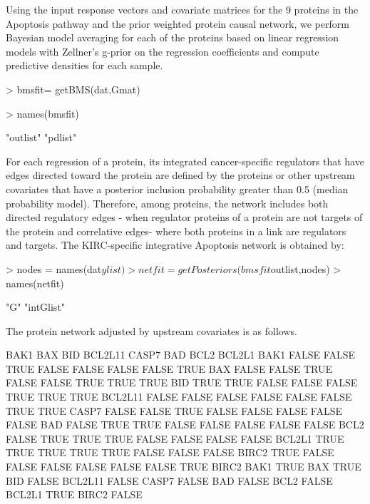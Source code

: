 \documentclass{article}
\begin{document}
Using the input response vectors and covariate matrices for the 9 proteins in the Apoptosis pathway and the prior weighted protein causal network, we perform Bayesian model averaging for each of the proteins based on linear regression models with Zellner's g-prior on the regression coefficients and compute predictive densities for each sample.
\begin{Schunk}
\begin{Sinput}
> bmsfit= getBMS(dat,Gmat)
\end{Sinput}
\end{Schunk}
\begin{Schunk}
\begin{Sinput}
> names(bmsfit)
\end{Sinput}
\begin{Soutput}
[1] "outlist" "pdlist" 
\end{Soutput}
\end{Schunk}
For each regression of a protein, its integrated cancer-specific regulators that have edges directed toward the protein are defined by the proteins or other upstream covariates that have a posterior inclusion probability greater than 0.5 (median probability model). Therefore, among proteins, the network includes both directed regulatory edges - when regulator proteins of a protein are not targets of the protein and correlative edges- where both proteins in a link are regulators and targets. The KIRC-specific integrative Apoptosis network is obtained by:
\begin{Schunk}
\begin{Sinput}
> nodes = names(dat$ylist)
> netfit = getPosteriors(bmsfit$outlist,nodes)
> names(netfit)
\end{Sinput}
\begin{Soutput}
[1] "G"        "intGlist"
\end{Soutput}
\end{Schunk}
The protein network adjusted by upstream covariates is as follows.
\begin{Schunk}
\begin{Soutput}
         BAK1   BAX   BID BCL2L11 CASP7   BAD  BCL2 BCL2L1
BAK1    FALSE FALSE  TRUE   FALSE FALSE FALSE FALSE   TRUE
BAX     FALSE FALSE  TRUE   FALSE FALSE  TRUE  TRUE   TRUE
BID      TRUE  TRUE FALSE   FALSE FALSE  TRUE  TRUE   TRUE
BCL2L11 FALSE FALSE FALSE   FALSE FALSE FALSE  TRUE   TRUE
CASP7   FALSE FALSE  TRUE   FALSE FALSE FALSE FALSE  FALSE
BAD     FALSE  TRUE  TRUE   FALSE FALSE FALSE FALSE  FALSE
BCL2    FALSE  TRUE  TRUE    TRUE FALSE FALSE FALSE  FALSE
BCL2L1   TRUE  TRUE  TRUE    TRUE  TRUE FALSE FALSE  FALSE
BIRC2    TRUE FALSE FALSE   FALSE FALSE FALSE FALSE   TRUE
        BIRC2
BAK1     TRUE
BAX      TRUE
BID     FALSE
BCL2L11 FALSE
CASP7   FALSE
BAD     FALSE
BCL2    FALSE
BCL2L1   TRUE
BIRC2   FALSE
\end{Soutput}
\end{Schunk}
\end{document}
